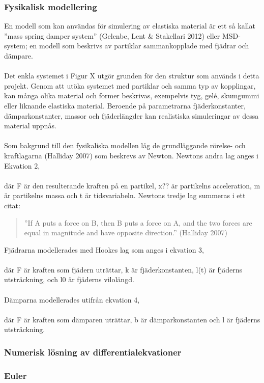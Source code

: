 \documentclass[a4paper,12pt,oneside,final,swedish]{extarticle}
\begin{document}
\subsubsection{Fysikalisk modellering}
En modell som kan användas för simulering av elastiska material är ett så kallat ''mass spring damper system'' (Gelenbe, Lent \& Stakellari 2012) eller MSD-system; en modell som beskrivs av partiklar sammankopplade med fjädrar och dämpare.
\\%
\\Det enkla systemet i Figur X utgör grunden för den struktur som används i detta projekt. 
Genom att utöka systemet med partiklar och samma typ av kopplingar, kan många olika material och former beskrivas, exempelvis tyg, gelé, skumgummi eller liknande elastiska material. 
Beroende på parametrarna fjäderkonstanter, dämparkonstanter, massor och fjäderlängder kan realistiska simuleringar av dessa material uppnås.
\\\\Som bakgrund till den fysikaliska modellen låg de grundläggande rörelse- och kraftlagarna (Halliday 2007) som beskrevs av Newton. 
Newtons andra lag anges i Ekvation 2, 
\\%
\\där F är den resulterande kraften på en partikel, x?? är partikelns acceleration, m är partikelns massa och t är tidsvariabeln. 
Newtons tredje lag summeras i ett citat:
\begin{quote}''If A puts a force on B, then B puts a force on A, and the two forces are equal in magnitude and have opposite direction.'' (Halliday 2007)\end{quote}
Fjädrarna modellerades med Hookes lag som anges i ekvation 3,
\\%
\\där F är kraften som fjädern uträttar, k är fjäderkonstanten, l(t) är fjäderns utsträckning, och l0 är fjäderns vilolängd.
\\\\Dämparna modellerades utifrån ekvation 4,
\\%
\\där F är kraften som dämparen uträttar, b är dämparkonstanten och l är fjäderns utsträckning.
\subsubsection{Numerisk lösning av differentialekvationer}
\subsubsection{Euler}%
\end{document}
